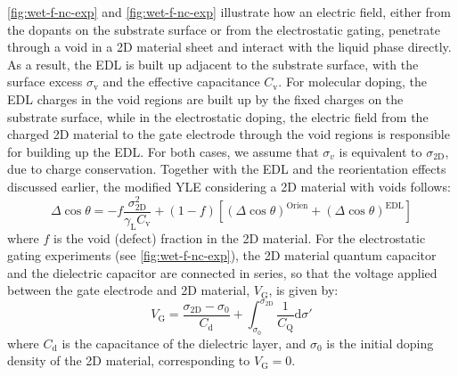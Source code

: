 \autoref{fig:wet-f-nc-exp} and \autoref{fig:wet-f-nc-exp} illustrate how
an electric field, either from the dopants on the substrate surface or
from the electrostatic gating, penetrate through a void in a 2D
material sheet and interact with the liquid phase directly. As a
result, the EDL is built up adjacent to the substrate surface, with
the surface excess \(\sigma_{\mathrm{v}}\) and the effective
capacitance \(C_{\mathrm{v}}\).  For molecular doping, the EDL charges
in the void regions are built up by the fixed charges on the substrate
surface, while in the electrostatic doping, the electric field from
the charged 2D material to the gate electrode through the void regions
is responsible for building up the EDL. For both cases, we assume that
\(\sigma_{v}\) is equivalent to \(\sigma_{\mathrm{2D}}\), due to
charge conservation. Together with the EDL and the reorientation
effects discussed earlier, the modified YLE considering a 2D material
with voids follows:
\begin{equation}
\label{eqn:wet-def-Delta-cos-mixture}
\Delta \cos \theta = -f\frac{\sigma_{\mathrm{2D}}^{2}}{\gamma_{\mathrm{L}} C_{\mathrm{v}}} 
                     + (1-f)[(\Delta \cos \theta)^{\mathrm{Orien}} + (\Delta \cos \theta)^{\mathrm{EDL}}]
\end{equation}
where \(f\) is the void (defect) fraction in the 2D material. For the
electrostatic gating experiments (see 
\autoref{fig:wet-f-nc-exp}), the 2D material quantum capacitor
and the dielectric capacitor are connected in
series, so that the voltage applied between the gate electrode and
2D material, \(V_{\mathrm{G}}\), is given by:
\begin{equation}
\label{eqn:wet-VG-gating}
V_{\mathrm{G}} = \frac{\sigma_{\mathrm{2D}} - \sigma_{\mathrm{0}}}{C_{\mathrm{d}}}
                  + \int_{\sigma_{0}}^{\sigma_{\mathrm{2D}}} \frac{1}{C_{\mathrm{Q}}} \mathrm{d}\sigma'
\end{equation}
where \(C_{\mathrm{d}}\) is the capacitance of the dielectric layer, and
\(\sigma_{0}\) is the initial doping density of the 2D material,
corresponding to \(V_{\mathrm{G}}=0\).


